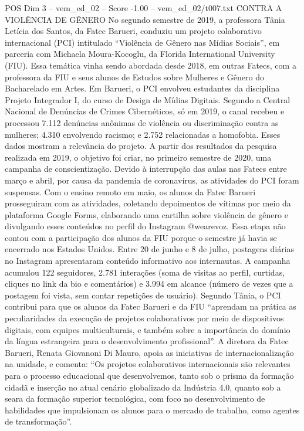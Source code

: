 \begin{textsample}{POS Dim 3 – vem\_ed\_02 – Score -1.00 – vem\_ed\_02/t007.txt}  \label{ex:f3_pos_050}
CONTRA A VIOLÊNCIA DE GÊNERO No segundo semestre de 2019, a professora Tânia Letícia dos Santos, da Fatec Barueri, conduziu um projeto colaborativo internacional (PCI) intitulado “Violência de Gênero nas Mídias Sociais”, em parceria com Michaela Moura-Kocoglu, da Florida International University (FIU).
Essa temática vinha sendo abordada desde 2018, em outras Fatecs, com a professora da FIU e seus alunos de Estudos sobre Mulheres e Gênero do Bacharelado em Artes.
Em Barueri, o PCI envolveu estudantes da disciplina Projeto Integrador I, do curso de Design de Mídias Digitais.
Segundo a Central Nacional de Denúncias de Crimes Cibernéticos, só em 2019, o canal recebeu e processou 7.112 denúncias anônimas de violência ou discriminação contra as mulheres; 4.310 envolvendo racismo; e 2.752 relacionadas a homofobia.
Esses dados mostram a relevância do projeto.
A partir dos resultados da pesquisa realizada em 2019, o objetivo foi criar, no primeiro semestre de 2020, uma campanha de conscientização.
Devido à interrupção das aulas nas Fatecs entre março e abril, por causa da pandemia de coronavírus, as atividades do PCI foram suspensas.
Com o ensino remoto em maio, os alunos da Fatec Barueri prosseguiram com as atividades, coletando depoimentos de vítimas por meio da plataforma Google Forms, elaborando uma cartilha sobre violência de gênero e divulgando esses conteúdos no perfil do Instagram @wearevoz.
Essa etapa não contou com a participação dos alunos da FIU porque o semestre já havia se encerrado nos Estados Unidos.
Entre 20 de junho e 8 de julho, postagens diárias no Instagram apresentaram conteúdo informativo aos internautas.
A campanha acumulou 122 seguidores, 2.781 interações (soma de visitas ao perfil, curtidas, cliques no link da bio e comentários) e 3.994 em alcance (número de vezes que a postagem foi vista, sem contar repetições de usuário).
Segundo Tânia, o PCI contribui para que os alunos da Fatec Barueri e da FIU “aprendam na prática as peculiaridades da execução de projetos colaborativos por meio de dispositivos digitais, com equipes multiculturais, e também sobre a importância do domínio da língua estrangeira para o desenvolvimento profissional”.
A diretora da Fatec Barueri, Renata Giovanoni Di Mauro, apoia as iniciativas de internacionalização na unidade, e comenta: “Os projetos colaborativos internacionais são relevantes para o processo educacional que desenvolvemos, tanto sob o prisma da formação cidadã e inserção no atual cenário globalizado da Indústria 4.0, quanto sob a seara da formação superior tecnológica, com foco no desenvolvimento de habilidades que impulsionam os alunos para o mercado de trabalho, como agentes de transformação”.

\end{textsample}
